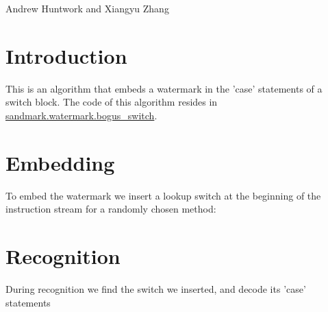 %
          {Andrew Huntwork and Xiangyu Zhang}

\section{Introduction}
This is an algorithm that embeds a watermark in the 'case' statements of a switch block.
The code of this algorithm
resides in \url{sandmark.watermark.bogus_switch}.


\section{Embedding}
To embed the watermark we insert a lookup switch at the beginning of the instruction stream for a randomly chosen method:

\section{Recognition}
During recognition we find the switch we inserted, and decode its 'case' statements

